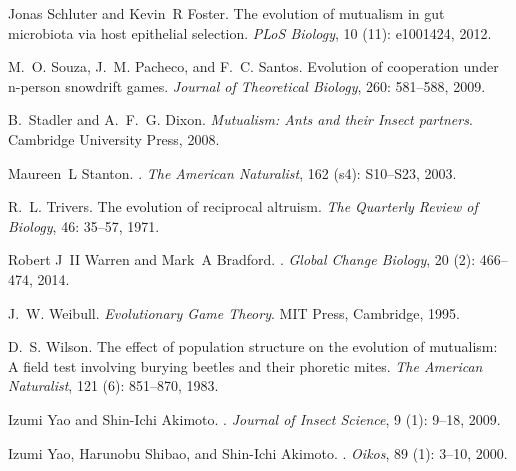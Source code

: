 \documentclass[12pt]{article}
\begin{document}
\begin{thebibliography}{61}
Jonas Schluter and Kevin~R Foster.
\newblock The evolution of mutualism in gut microbiota via host epithelial
  selection.
\newblock \emph{PLoS Biology}, 10 (11): e1001424, 2012.

M.~O. Souza, J.~M. Pacheco, and F.~C. Santos.
\newblock Evolution of cooperation under n-person snowdrift games.
\newblock \emph{Journal of Theoretical Biology}, 260: 581--588, 2009.

B.~Stadler and A.~F.~G. Dixon.
\newblock \emph{Mutualism: Ants and their Insect partners}.
\newblock Cambridge University Press, 2008.

Maureen~L Stanton.
.
\newblock \emph{The American Naturalist}, 162 (s4): S10--S23,
  2003.

R.~L. Trivers.
\newblock The evolution of reciprocal altruism.
\newblock \emph{The Quarterly Review of Biology}, 46: 35--57, 1971.

Robert J~II Warren and Mark~A Bradford.
.
\newblock \emph{Global Change Biology}, 20 (2): 466--474,
  2014.

J.~W. Weibull.
\newblock \emph{Evolutionary Game Theory}.
\newblock MIT Press, Cambridge, 1995.

D.~S. Wilson.
\newblock The effect of population structure on the evolution of mutualism: A
  field test involving burying beetles and their phoretic mites.
\newblock \emph{The American Naturalist}, 121 (6): 851--870,
  1983.

Izumi Yao and Shin-Ichi Akimoto.
.
\newblock \emph{Journal of Insect Science}, 9 (1): 9--18,
  2009.

Izumi Yao, Harunobu Shibao, and Shin-Ichi Akimoto.
.
\newblock \emph{Oikos}, 89 (1): 3--10, 2000.

\end{thebibliography}
\end{document}
